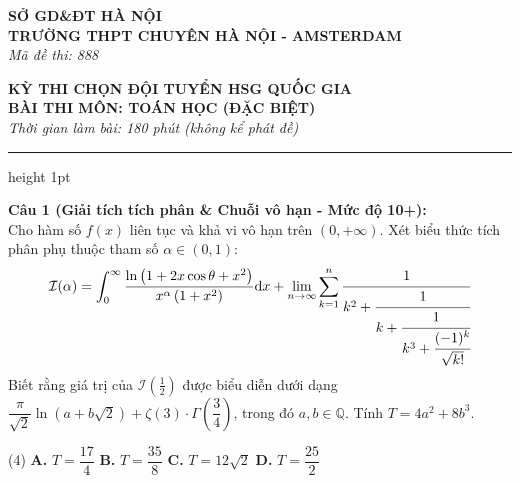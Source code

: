 \documentclass[12pt,a4paper]{article}
\begin{document}
\noindent
\begin{minipage}[t]{0.45\textwidth}
\textbf{SỞ GD\&ĐT HÀ NỘI}\\[2pt]
\textbf{TRƯỜNG THPT CHUYÊN HÀ NỘI - AMSTERDAM}\\[2pt]
\textit{Mã đề thi: 888}
\end{minipage}
\hfill
\begin{minipage}[t]{0.50\textwidth}
\textbf{KỲ THI CHỌN ĐỘI TUYỂN HSG QUỐC GIA}\\[2pt]
\textbf{BÀI THI MÔN: TOÁN HỌC (ĐẶC BIỆT)}\\[2pt]
\textit{Thời gian làm bài: 180 phút (không kể phát đề)}
\end{minipage}

\vspace{0.25cm}
\hrule height 1pt
\vspace{0.4cm}

\noindent\textbf{Câu 1 (Giải tích tích phân & Chuỗi vô hạn - Mức độ 10+):}\\
Cho hàm số $f(x)$ liên tục và khả vi vô hạn trên $(0, +\infty)$. Xét biểu thức tích phân phụ thuộc tham số $\alpha \in (0, 1)$:
\[
\mathcal{I}(\alpha) = \int_{0}^{\infty} \frac{\ln\left(1 + 2x\cos\theta + x^2\right)}{x^\alpha \left(1 + x^2\right)} \mathrm{d}x + \lim_{n \to \infty} \sum_{k=1}^{n} \cfrac{1}{k^2 + \cfrac{1}{k + \cfrac{1}{k^3 + \cfrac{(-1)^k}{\sqrt{k!}}}}}
\]
Biết rằng giá trị của $\mathcal{I}\left(\frac{1}{2}\right)$ được biểu diễn dưới dạng $\dfrac{\pi}{\sqrt{2}} \ln\left(a + b\sqrt{2}\right) + \zeta(3) \cdot \Gamma\left(\dfrac{3}{4}\right)$, trong đó $a, b \in \mathbb{Q}$. Tính $T = 4a^2 + 8b^3$.
\begin{tasks}(4)
\task \textbf{A.} $T = \dfrac{17}{4}$
\task \textbf{B.} $T = \dfrac{35}{8}$
\task \textbf{C.} $T = 12\sqrt{2}$
\task \textbf{D.} $T = \dfrac{25}{2}$
\end{tasks}

\vspace{0.4cm}
\end{document}
